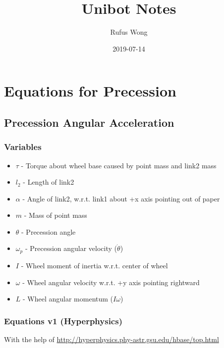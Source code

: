 \documentclass{article}
\title{Unibot Notes}
\date{2019-07-14}
\author{Rufus Wong}
\begin{document}
\maketitle
{}
\newpage

\section{Equations for Precession}

\subsection{Precession Angular Acceleration}

\subsubsection{Variables}

\begin{itemize}
    \item $\tau$ - Torque about wheel base caused by point mass and link2 mass
    \item $l_2$ - Length of link2
    \item $\alpha$ - Angle of link2, w.r.t. link1 about +x axis pointing out of paper
    \item $m$ - Mass of point mass
    \item $\theta$ - Precession angle
    \item $\omega_p$ - Precession angular velocity ($\dot{\theta}$)
    \item $I$ - Wheel moment of inertia w.r.t. center of wheel
    \item $\omega$ - Wheel angular velocity w.r.t. +y axis pointing rightward
    \item $L$ - Wheel angular momentum ($I\omega$)
\end{itemize}

\subsubsection{Equations v1 (Hyperphysics)}

With the help of \url{http://hyperphysics.phy-astr.gsu.edu/hbase/top.html}
\end{document}
